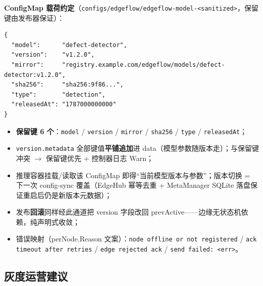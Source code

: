 \textbf{ConfigMap 载荷约定}（\texttt{configs/edgeflow/edgeflow-model-<sanitized>}，保留键由发布器保证）：

\begin{lstlisting}
{
  "model":      "defect-detector",
  "version":    "v1.2.0",
  "mirror":     "registry.example.com/edgeflow/models/defect-detector:v1.2.0",
  "sha256":     "sha256:9f86...",
  "type":       "detection",
  "releasedAt": "1787000000000"
}
\end{lstlisting}

\begin{itemize}
  \item \textbf{保留键 6 个}：\texttt{model} / \texttt{version} / \texttt{mirror} / \texttt{sha256} / \texttt{type} / \texttt{releasedAt}；
  \item \texttt{version.metadata} 全部键值\textbf{平铺追加}进 data（模型参数随版本走）；与保留键冲突 $\rightarrow$ 保留键优先 + 控制器日志 Warn；
  \item 推理容器挂载/读取该 ConfigMap 即得“当前模型版本与参数”；版本切换 = 下一次 config-sync 覆盖（EdgeHub 幂等去重 + MetaManager SQLite 落盘保证重启后仍是新版本元数据）；
  \item 发布\textbf{回滚}同样经此通道把 version 字段改回 prevActive——边缘无状态机依赖，纯声明式收敛；
  \item 错误映射（perNode.Reason 文案）：\texttt{node offline or not registered} / \texttt{ack timeout after retries} / \texttt{edge rejected ack} / \texttt{send failed: <err>}。
\end{itemize}

\subsection{灰度运营建议}

